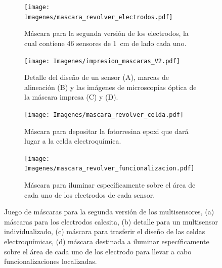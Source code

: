 				 		\begin{figure}[ht!]
			 	   	    \centering
			 	   	    \begin{subfigure}[t]{0.495\textwidth}
			        	\texttt{[image: Imagenes/mascara\_revolver\_electrodos.pdf]}
			       		\caption{Máscara para la segunda versión de los electrodos, la cual contiene 46 sensores de \SI{1}{cm} de lado cada uno.}
			         	\label{fig:mascara_v2}
			     		\end{subfigure}
			     		\begin{subfigure}[t]{0.495\textwidth}
			     		\texttt{[image: Imagenes/impresion\_mascaras\_V2.pdf]}
			    		\caption{Detalle del diseño de un sensor (A), marcas de alineación (B) y las imágenes de microscopías óptica de la máscara impresa (C) y (D).}
			    		\label{fig:impresion_diseno_v2_b}	
						\end{subfigure}
			     		\begin{subfigure}[t]{0.495\textwidth}
			         	\vspace*{1mm}
			         	\texttt{[image: Imagenes/mascara\_revolver\_celda.pdf]}
			        	\caption{Máscara para depositar la fotorresina epoxi que dará lugar a la celda electroquímica.}
			         	\label{fig:mascara_su8}
			     		\end{subfigure}
						\begin{subfigure}[t]{0.495\textwidth}
			     		\vspace*{1mm}
			     		\texttt{[image: Imagenes/mascara\_revolver\_funcionalizacion.pdf]}
			        	\caption{Máscara para iluminar específicamente sobre el área de cada uno de los electrodos de cada sensor.}
			         	\label{fig:mascara_funcionalizacion}
			     		\end{subfigure}
			     		\caption[Juego de máscara. Segunda versión]{Juego de máscaras para la segunda versión de los multisensores, (a) máscaras  para los electrodos calesita, (b) detalle para un multisensor individualizado, (c) máscara para trasferir el diseño de las celdas electroquímica\index{electroquimico}s, (d) máscara destinada a iluminar específicamente sobre el área de cada uno de los electrodo para llevar a cabo funcionalizaciones localizadas.}
			     		\label{fig:impresion_diseno_V2}
			     		\vspace*{3mm}
			     	   	\end{figure}

